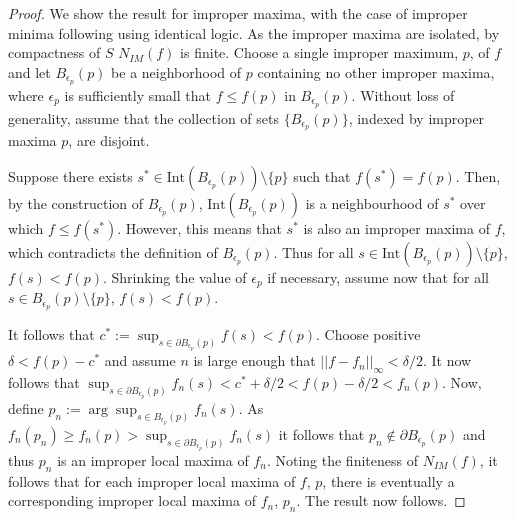 \documentclass[11pt]{article}
\newcommand{\1}{\mathbf{1}}
\theoremstyle{definition}
\theoremstyle{remark}
\begin{document}
\begin{proof}
    We show the result for improper maxima, with the case of improper minima following using identical logic. As the improper maxima are isolated, by compactness of $S$ $N_{IM}(f)$ is finite. Choose a single improper maximum, $p$, of $f$ and let $B_{\epsilon_p}(p)$ be a neighborhood of $p$ containing no other improper maxima, where $\epsilon_p$ is sufficiently small that $f\leq f(p)$ in $B_{\epsilon_p}(p)$. Without loss of generality, assume that the collection of sets $\{B_{\epsilon_p}(p)\}$, indexed by improper maxima $p$, are disjoint.
    
    Suppose there exists $s^* \in \text{Int}(B_{\epsilon_p}(p))\setminus\{p\}$ such that $f(s^*)=f(p)$. Then, by the construction of $B_{\epsilon_p}(p)$, $\text{Int}(B_{\epsilon_p}(p))$ is a neighbourhood of $s^*$ over which $f\leq f(s^*)$. However, this means that $s^*$ is also an improper maxima of $f$, which contradicts the definition of $B_{\epsilon_p}(p)$. Thus for all $s\in \text{Int}(B_{\epsilon_p}(p))\setminus\{p\}$, $f(s)<f(p)$. Shrinking the value of $\epsilon_p$ if necessary, assume now that for all $s\in B_{\epsilon_p}(p)\setminus\{p\}$, $f(s)<f(p)$.
    
    It follows that $c^*:=\sup_{s\in\partial B_{\epsilon_p}(p)}f(s)<f(p)$. Choose positive $\delta< f(p)-c^*$ and assume $n$ is large enough that $||f-f_n||_\infty<\delta/2$. It now follows that $\sup_{s \in \partial B_{\epsilon_p}(p)}f_n(s)<c^* + \delta/2 < f(p)- \delta/2 < f_n(p)$. Now, define $p_n:=\arg\sup_{s\in B_{\epsilon_p}(p)}f_n(s)$. As $f_n(p_n)\geq f_n(p)> \sup_{s \in \partial B_{\epsilon_p}(p)}f_n(s)$ it follows that $p_n\not\in \partial B_{\epsilon_p}(p)$ and thus $p_n$ is an improper local maxima of $f_n$. Noting the finiteness of $N_{IM}(f)$, it follows that for each improper local maxima of $f$, $p$, there is eventually a corresponding improper local maxima of $f_n$, $p_n$. The result now follows.
\end{proof}
\end{document}

